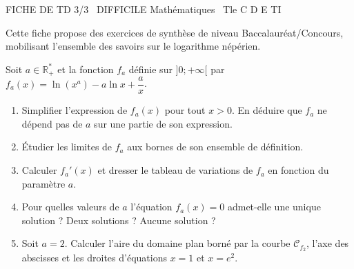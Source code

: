 \documentclass[11pt]{article}
\begin{document}
\begin{tcolorbox}[enhanced,colback=popink,colframe=popink,arc=10pt,boxrule=0pt,left=12pt,right=12pt,top=9pt,bottom=9pt]
{\color{white}\popxbold\small FICHE DE TD 3/3 \textbullet\ DIFFICILE \hfill Mathématiques \textbullet\ Tle C D E TI\par}
\end{tcolorbox}
\vspace{4pt}
Cette fiche propose des exercices de synthèse de niveau Baccalauréat/Concours, mobilisant l'ensemble des savoirs sur le logarithme népérien.

\begin{exercice}
Soit $a \in \mathbb{R}^*_+$ et la fonction $f_a$ définie sur $]0; +\infty[$ par $f_a(x) = \ln(x^a) - a\ln x + \dfrac{a}{x}$.
\begin{enumerate}
    \item Simplifier l'expression de $f_a(x)$ pour tout $x>0$. En déduire que $f_a$ ne dépend pas de $a$ sur une partie de son expression.
    \item Étudier les limites de $f_a$ aux bornes de son ensemble de définition.
    \item Calculer $f_a'(x)$ et dresser le tableau de variations de $f_a$ en fonction du paramètre $a$.
    \item Pour quelles valeurs de $a$ l'équation $f_a(x) = 0$ admet-elle une unique solution ? Deux solutions ? Aucune solution ?
    \item Soit $a=2$. Calculer l'aire du domaine plan borné par la courbe $\mathcal{C}_{f_2}$, l'axe des abscisses et les droites d'équations $x=1$ et $x=e^2$.
\end{enumerate}
\end{exercice}
\end{document}
